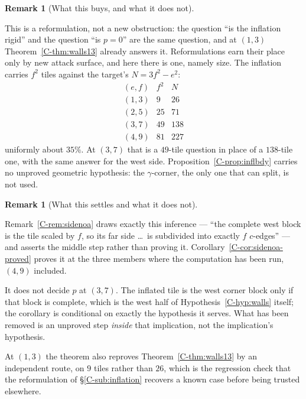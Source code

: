 \documentclass[11pt,reqno]{amsart}
\theoremstyle{plain}
\theoremstyle{definition}
\newtheorem{remark}[theorem]{Remark}
\begin{document}
\begin{remark}[What this buys, and what it does not]\label{O-inflvalue}

This is a reformulation, not a new obstruction: the question ``is the inflation rigid'' and the
question ``is $p=0$'' are the same question, and at $(1,3)$ Theorem~\ref{C-thm:walls13} already answers
it. Reformulations earn their place only by new attack surface, and here there is one, namely size.
The inflation carries $f^2$ tiles against the target's $N=3f^2-e^2$:
\[
\begin{array}{rrr}
(e,f) & f^2 & N\\\hline
(1,3) & 9 & 26\\
(2,5) & 25 & 71\\
(3,7) & 49 & 138\\
(4,9) & 81 & 227
\end{array}
\]
uniformly about $35\%$. At $(3,7)$ that is a $49$-tile question in place of a $138$-tile one, with the
same answer for the west side. Proposition~\ref{C-prop:inflbdy} carries no unproved geometric hypothesis:
the $\gamma$-corner, the only one that can split, is not used.
\end{remark}

\begin{remark}[What this settles and what it does not]\label{O-inflrigidscope}

Remark~\ref{C-rem:sidenoa} draws exactly this inference --- ``the complete west block is the tile scaled
by $f$, so its far side \dots\ is subdivided into exactly $f$ $c$-edges'' --- and asserts the middle
step rather than proving it. Corollary~\ref{C-cor:sidenoa-proved} proves it at the three members where the
computation has been run, $(4,9)$ included.

It does not decide $p$ at $(3,7)$. The inflated tile is the west corner block only if that block is
complete, which is the west half of Hypothesis~\ref{C-hyp:walls} itself; the corollary is conditional on
exactly the hypothesis it serves. What has been removed is an unproved step \emph{inside} that
implication, not the implication's hypothesis.

At $(1,3)$ the theorem also reproves Theorem~\ref{C-thm:walls13} by an independent route, on $9$ tiles
rather than $26$, which is the regression check that the reformulation of \S\ref{C-sub:inflation}
recovers a known case before being trusted elsewhere.
\end{remark}
\end{document}
